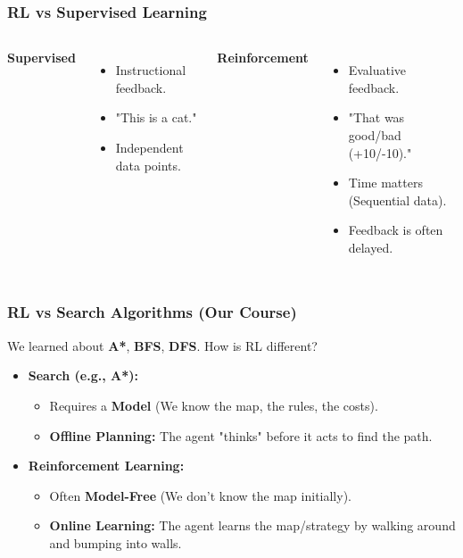 \documentclass[aspectratio=169]{beamer}
\begin{document}
\begin{frame}
    \frametitle{RL vs Supervised Learning}
    \begin{columns}
        \textbf{Supervised}
        \begin{itemize}
            \item Instructional feedback.
            \item "This is a cat."
            \item Independent data points.
        \end{itemize}

        \textbf{Reinforcement}
        \begin{itemize}
            \item Evaluative feedback.
            \item "That was good/bad (+10/-10)."
            \item Time matters (Sequential data).
            \item Feedback is often delayed.
        \end{itemize}
    \end{columns}
\end{frame}

\begin{frame}
    \frametitle{RL vs Search Algorithms (Our Course)}
    We learned about \textbf{A*}, \textbf{BFS}, \textbf{DFS}. How is RL different?
    \vspace{0.5cm}
    \begin{itemize}
        \item \textbf{Search (e.g., A*):}
        \begin{itemize}
            \item Requires a \textbf{Model} (We know the map, the rules, the costs).
            \item \textbf{Offline Planning:} The agent "thinks" before it acts to find the path.
        \end{itemize}
        \item \textbf{Reinforcement Learning:}
        \begin{itemize}
            \item Often \textbf{Model-Free} (We don't know the map initially).
            \item \textbf{Online Learning:} The agent learns the map/strategy by walking around and bumping into walls.
        \end{itemize}
    \end{itemize}
\end{frame}
\end{document}
